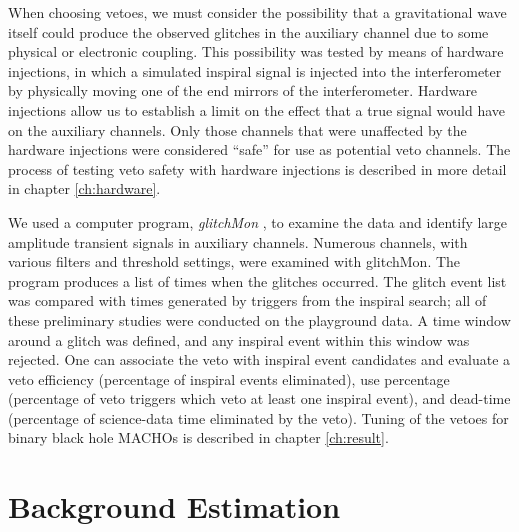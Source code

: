 When choosing vetoes, we must consider the possibility that a gravitational
wave itself could produce the observed glitches in the auxiliary channel due
to some physical or electronic coupling.  This possibility was tested by means
of hardware injections, in which a simulated inspiral signal is injected into
the interferometer by physically moving one of the end mirrors of the
interferometer. Hardware injections allow us to establish a limit on the
effect that a true signal would have on the auxiliary channels.  Only those
channels that were unaffected by the hardware injections were considered
``safe'' for use as potential veto channels. The process of testing veto
safety with hardware injections is described in more detail in chapter
\ref{ch:hardware}.

We used a computer program, {\it glitchMon} \cite{glitchMon}, to examine the
data and identify large amplitude transient signals in auxiliary channels.
Numerous channels, with various filters and threshold settings, were examined
with glitchMon. The program produces a list of times when the glitches
occurred. The glitch event list was compared with times generated by triggers
from the inspiral search; all of these preliminary studies were conducted on
the playground data.  A time window around a glitch was defined, and any
inspiral event within this window was rejected. One can associate the veto
with inspiral event candidates and evaluate a veto efficiency (percentage of
inspiral events eliminated), use percentage (percentage of veto triggers which
veto at least one inspiral event), and dead-time (percentage of science-data
time eliminated by the veto). Tuning of the vetoes for binary black hole
MACHOs is described in chapter \ref{ch:result}.

\section{Background Estimation}
\label{s:background}

